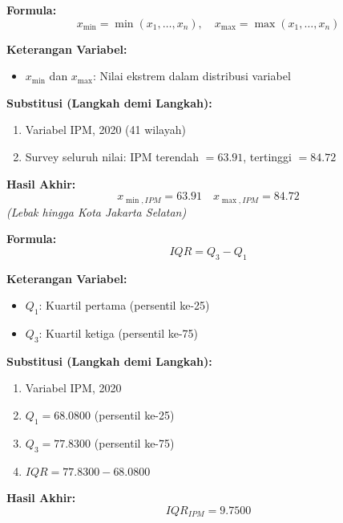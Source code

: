 \documentclass[11pt,a4paper]{article}
\begin{document}
\begin{tcolorbox}[formula_box, title={5. Nilai Minimum dan Maksimum}]
\textbf{Formula:}
\[ x_{\min} = \min(x_1,\ldots,x_n),\quad x_{\max} = \max(x_1,\ldots,x_n) \]

\textbf{Keterangan Variabel:}
\begin{itemize}
  \item $x_{\min}$ dan $x_{\max}$: Nilai ekstrem dalam distribusi variabel
\end{itemize}

\textbf{Substitusi (Langkah demi Langkah):}
\begin{enumerate}
  \item Variabel IPM, 2020 (41 wilayah)
  \item Survey seluruh nilai: IPM terendah $= 63.91$, tertinggi $= 84.72$
\end{enumerate}

\textbf{Hasil Akhir:}
\[ x_{\min,IPM} = 63.91 \quad x_{\max,IPM} = 84.72 \]
\textit{(Lebak hingga Kota Jakarta Selatan)}
\end{tcolorbox}

\begin{tcolorbox}[formula_box, title={6. Jangkauan Interkuartil (IQR)}]
\textbf{Formula:}
\[ IQR = Q_3 - Q_1 \]

\textbf{Keterangan Variabel:}
\begin{itemize}
  \item $Q_1$: Kuartil pertama (persentil ke-25)
  \item $Q_3$: Kuartil ketiga (persentil ke-75)
\end{itemize}

\textbf{Substitusi (Langkah demi Langkah):}
\begin{enumerate}
  \item Variabel IPM, 2020
  \item $Q_1 = 68.0800$ (persentil ke-25)
  \item $Q_3 = 77.8300$ (persentil ke-75)
  \item $IQR = 77.8300 - 68.0800$
\end{enumerate}

\textbf{Hasil Akhir:}
\[ IQR_{IPM} = 9.7500 \]
\end{tcolorbox}
\end{document}
